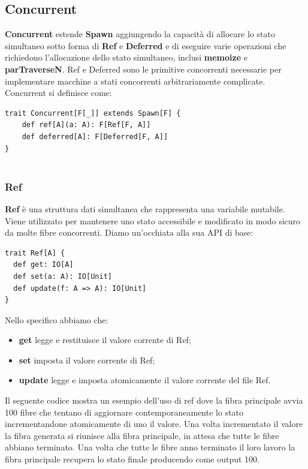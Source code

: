 \subsection{Concurrent}
\textbf{Concurrent} estende \textbf{Spawn} aggiungendo la capacità di allocare lo stato simultaneo sotto forma di \textbf{Ref} e \textbf{Deferred} e di eseguire varie operazioni che richiedono l'allocazione dello stato simultaneo, inclusi \textbf{memoize} e \textbf{parTraverseN}. Ref e Deferred sono le primitive concorrenti necessarie per implementare macchine a stati concorrenti arbitrariamente complicate. Concurrent si definisce come:
\begin{verbatim}
trait Concurrent[F[_]] extends Spawn[F] {
    def ref[A](a: A): F[Ref[F, A]]
    def deferred[A]: F[Deferred[F, A]]
}
   
\end{verbatim}

\subsubsection{Ref}
\textbf{Ref} è una struttura dati simultanea che rappresenta una variabile mutabile. Viene utilizzato per mantenere uno stato accessibile e modificato in modo sicuro da molte fibre concorrenti. Diamo un'occhiata alla sua API di base:
\begin{verbatim}
trait Ref[A] {
  def get: IO[A]
  def set(a: A): IO[Unit]
  def update(f: A => A): IO[Unit]
}
\end{verbatim}

\noindent Nello specifico abbiamo che:
\begin{itemize}
    \item \textbf{get} legge e restituisce il valore corrente di Ref;
    \item  \textbf{set} imposta il valore corrente di Ref;
    \item  \textbf{update} legge e imposta atomicamente il valore corrente del file Ref.
\end{itemize}

\noindent Il seguente codice mostra un esempio dell'uso di ref dove la fibra principale avvia 100 fibre che tentano di aggiornare contemporaneamente lo stato incrementandone atomicamente di uno il valore. Una volta incrementato il valore la fibra generata si riunisce alla fibra principale, in attesa che tutte le fibre abbiano terminato. Una volta che tutte le fibre anno terminato il loro lavoro la fibra principale recupera lo stato finale producendo come output 100. 

